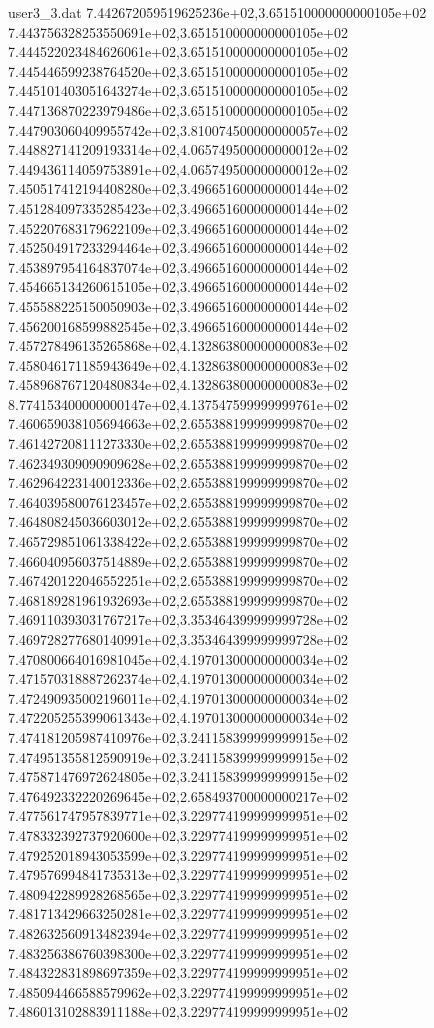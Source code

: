 \begin{filecontents}{user3_3.dat}
7.442672059519625236e+02,3.651510000000000105e+02
7.443756328253550691e+02,3.651510000000000105e+02
7.444522023484626061e+02,3.651510000000000105e+02
7.445446599238764520e+02,3.651510000000000105e+02
7.445101403051643274e+02,3.651510000000000105e+02
7.447136870223979486e+02,3.651510000000000105e+02
7.447903060409955742e+02,3.810074500000000057e+02
7.448827141209193314e+02,4.065749500000000012e+02
7.449436114059753891e+02,4.065749500000000012e+02
7.450517412194408280e+02,3.496651600000000144e+02
7.451284097335285423e+02,3.496651600000000144e+02
7.452207683179622109e+02,3.496651600000000144e+02
7.452504917233294464e+02,3.496651600000000144e+02
7.453897954164837074e+02,3.496651600000000144e+02
7.454665134260615105e+02,3.496651600000000144e+02
7.455588225150050903e+02,3.496651600000000144e+02
7.456200168599882545e+02,3.496651600000000144e+02
7.457278496135265868e+02,4.132863800000000083e+02
7.458046171185943649e+02,4.132863800000000083e+02
7.458968767120480834e+02,4.132863800000000083e+02
8.774153400000000147e+02,4.137547599999999761e+02
7.460659038105694663e+02,2.655388199999999870e+02
7.461427208111273330e+02,2.655388199999999870e+02
7.462349309090909628e+02,2.655388199999999870e+02
7.462964223140012336e+02,2.655388199999999870e+02
7.464039580076123457e+02,2.655388199999999870e+02
7.464808245036603012e+02,2.655388199999999870e+02
7.465729851061338422e+02,2.655388199999999870e+02
7.466040956037514889e+02,2.655388199999999870e+02
7.467420122046552251e+02,2.655388199999999870e+02
7.468189281961932693e+02,2.655388199999999870e+02
7.469110393031767217e+02,3.353464399999999728e+02
7.469728277680140991e+02,3.353464399999999728e+02
7.470800664016981045e+02,4.197013000000000034e+02
7.471570318887262374e+02,4.197013000000000034e+02
7.472490935002196011e+02,4.197013000000000034e+02
7.472205255399061343e+02,4.197013000000000034e+02
7.474181205987410976e+02,3.241158399999999915e+02
7.474951355812590919e+02,3.241158399999999915e+02
7.475871476972624805e+02,3.241158399999999915e+02
7.476492332220269645e+02,2.658493700000000217e+02
7.477561747957839771e+02,3.229774199999999951e+02
7.478332392737920600e+02,3.229774199999999951e+02
7.479252018943053599e+02,3.229774199999999951e+02
7.479576994841735313e+02,3.229774199999999951e+02
7.480942289928268565e+02,3.229774199999999951e+02
7.481713429663250281e+02,3.229774199999999951e+02
7.482632560913482394e+02,3.229774199999999951e+02
7.483256386760398300e+02,3.229774199999999951e+02
7.484322831898697359e+02,3.229774199999999951e+02
7.485094466588579962e+02,3.229774199999999951e+02
7.486013102883911188e+02,3.229774199999999951e+02

\end{filecontents}

